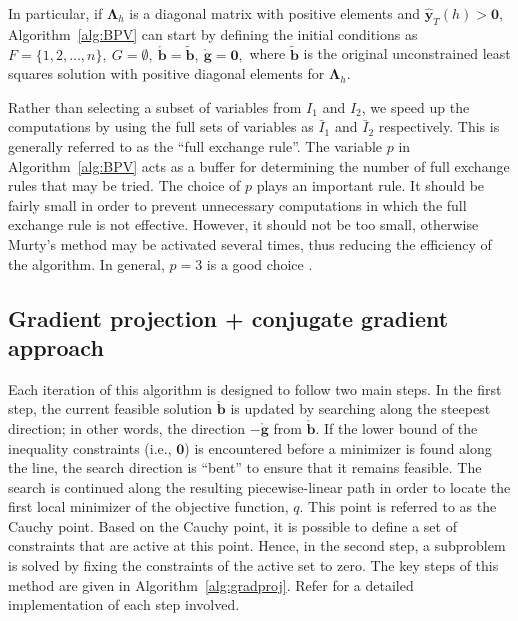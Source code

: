 \documentclass[twocolumn]{svjour3}
\begin{document}
In particular, if $\bm{\Lambda}_{h}$ is a diagonal matrix with positive elements and $\hat{\bm{y}}_{T}(h) > \bm{0}$, Algorithm~\ref{alg:BPV} can start by defining the initial conditions as $
F = \{1, 2, \dots, n\},\ G = \emptyset,\ \mathring{\bm{b}} = \tilde{\bm{b}},\ \mathring{\bm{g}} = \bm{0},$
where $\tilde{\bm{b}}$ is the original unconstrained least squares solution with positive diagonal elements for $\bm{\Lambda}_{h}$.

Rather than selecting a subset of variables from $I_{1}$ and $I_{2}$, we speed up the computations by using the full sets of variables as $\bar{I}_{1}$ and $\bar{I}_{2}$ respectively. This is generally referred to as the ``full exchange rule''. The variable $p$ in Algorithm~\ref{alg:BPV} acts as a buffer for determining the number of full exchange rules that may be tried. The choice of $p$ plays an important rule. It should be fairly small in order to prevent unnecessary computations in which the full exchange rule is not effective. However, it should not be too small, otherwise Murty's method may be activated several times, thus reducing the efficiency of the algorithm. In general, $p = 3$ is a good choice \citep{Judice1994}.

\subsection{Gradient projection + conjugate gradient approach}

Each iteration of this algorithm is designed to follow two main steps. In the first step, the current feasible solution $\mathring{\bm{b}}$ is updated by searching along the steepest direction; in other words, the direction $-\mathring{\bm{g}}$ from $\mathring{\bm{b}}$. If the lower bound of the inequality constraints (i.e., $\bm{0}$) is encountered before a minimizer is found along the line, the search direction is ``bent'' to ensure that it remains feasible. The search is continued along the resulting piecewise-linear path in order to locate the first local minimizer of the objective function, $q$. This point is referred to as the Cauchy point. Based on the Cauchy point, it is possible to define a set of constraints that are active at this point. Hence, in the second step, a subproblem is solved by fixing the constraints of the active set to zero. The key steps of this method are given in Algorithm~\ref{alg:gradproj}. Refer \citet{Nocedal2006} for a detailed implementation of each step involved.
\end{document}

